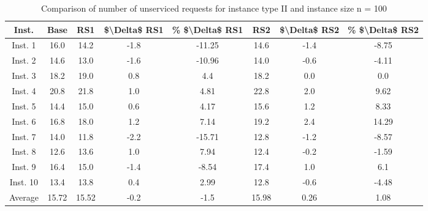 \begin{table}[H]
\centering
\begin{tabular}{cccccccc}
  \hline
  \textbf{Inst.} & \textbf{Base} & \textbf{RS1} & \textbf{\$\textbackslash{}Delta\$  RS1} & \textbf{\% \$\textbackslash{}Delta\$  RS1} & \textbf{RS2} & \textbf{\$\textbackslash{}Delta\$  RS2} & \textbf{\% \$\textbackslash{}Delta\$  RS2} \\\hline
  Inst. 1 & 16.0 & 14.2 & -1.8 & -11.25 & 14.6 & -1.4 & -8.75 \\
  Inst. 2 & 14.6 & 13.0 & -1.6 & -10.96 & 14.0 & -0.6 & -4.11 \\
  Inst. 3 & 18.2 & 19.0 & 0.8 & 4.4 & 18.2 & 0.0 & 0.0 \\
  Inst. 4 & 20.8 & 21.8 & 1.0 & 4.81 & 22.8 & 2.0 & 9.62 \\
  Inst. 5 & 14.4 & 15.0 & 0.6 & 4.17 & 15.6 & 1.2 & 8.33 \\
  Inst. 6 & 16.8 & 18.0 & 1.2 & 7.14 & 19.2 & 2.4 & 14.29 \\
  Inst. 7 & 14.0 & 11.8 & -2.2 & -15.71 & 12.8 & -1.2 & -8.57 \\
  Inst. 8 & 12.6 & 13.6 & 1.0 & 7.94 & 12.4 & -0.2 & -1.59 \\
  Inst. 9 & 16.4 & 15.0 & -1.4 & -8.54 & 17.4 & 1.0 & 6.1 \\
  Inst. 10 & 13.4 & 13.8 & 0.4 & 2.99 & 12.8 & -0.6 & -4.48 \\
  Average & 15.72 & 15.52 & -0.2 & -1.5 & 15.98 & 0.26 & 1.08 \\\hline
\end{tabular}
\caption{Comparison of number of unserviced requests for instance type II and instance size n = 100}
\label{tab:wait:resrelocation-nTaxi-comparison_II_100}
\end{table}

